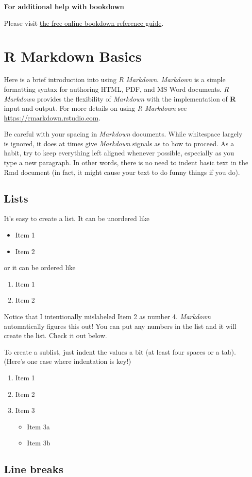 \textbf{For additional help with bookdown}

Please visit \href{https://bookdown.org/yihui/bookdown/}{the free online bookdown reference guide}.

\hypertarget{rmd-basics}{%
\chapter{R Markdown Basics}\label{rmd-basics}}

Here is a brief introduction into using \emph{R Markdown}. \emph{Markdown} is a simple formatting syntax for authoring HTML, PDF, and MS Word documents. \emph{R Markdown} provides the flexibility of \emph{Markdown} with the implementation of \textbf{R} input and output. For more details on using \emph{R Markdown} see \url{https://rmarkdown.rstudio.com}.

Be careful with your spacing in \emph{Markdown} documents. While whitespace largely is ignored, it does at times give \emph{Markdown} signals as to how to proceed. As a habit, try to keep everything left aligned whenever possible, especially as you type a new paragraph. In other words, there is no need to indent basic text in the Rmd document (in fact, it might cause your text to do funny things if you do).

\hypertarget{lists}{%
\section{Lists}\label{lists}}

It's easy to create a list. It can be unordered like
\begin{itemize}
\tightlist
\item
  Item 1
\item
  Item 2
\end{itemize}
or it can be ordered like
\begin{enumerate}
\def\labelenumi{\arabic{enumi}.}
\tightlist
\item
  Item 1
\item
  Item 2
\end{enumerate}
Notice that I intentionally mislabeled Item 2 as number 4. \emph{Markdown} automatically figures this out! You can put any numbers in the list and it will create the list. Check it out below.

To create a sublist, just indent the values a bit (at least four spaces or a tab). (Here's one case where indentation is key!)
\begin{enumerate}
\def\labelenumi{\arabic{enumi}.}
\tightlist
\item
  Item 1
\item
  Item 2
\item
  Item 3
  \begin{itemize}
  \tightlist
  \item
    Item 3a
  \item
    Item 3b
  \end{itemize}
\end{enumerate}
\hypertarget{line-breaks}{%
\section{Line breaks}\label{line-breaks}}

